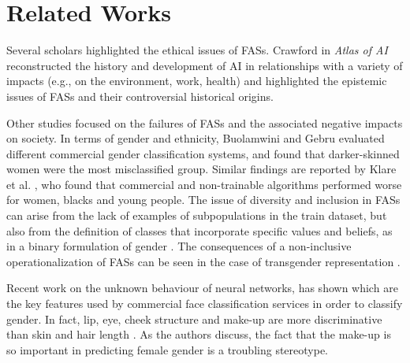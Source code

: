 \section{Related Works}
\label{sec:rel_work}
Several scholars highlighted the ethical issues of FASs.
Crawford in \textit{Atlas of AI} \cite{crawfordAtlasAI2021} reconstructed the history and development of AI in relationships with a variety of impacts (e.g., on the environment, work, health) and highlighted the epistemic issues of FASs and their controversial historical origins.

Other studies focused on the failures of FASs and the associated negative impacts on society. 
In terms of gender and ethnicity, Buolamwini and Gebru \cite{buolamwiniGenderShadesIntersectional2018} evaluated different commercial gender classification systems, and found that darker-skinned women were the most misclassified group.
Similar findings are reported by Klare
et al. \cite{klareFaceRecognitionPerformance2012}, who found that commercial and non-trainable algorithms performed worse for women, blacks and young people.
The issue of diversity and inclusion in FASs can arise from the lack of examples of subpopulations in the train dataset, but also from the definition of classes that incorporate specific values and beliefs, as in a binary formulation of gender \cite{scheuermanHowComputersSee2019}.
The consequences of a non-inclusive operationalization of FASs can be seen in the case of transgender representation \cite{keyesMisgenderingMachinesTrans2018}.

Recent work on the unknown behaviour of neural networks, has shown which are the key features used by commercial face classification services in order to classify gender. 
In fact, lip, eye, cheek structure and make-up are more discriminative than skin and hair length \cite{muthukumarUnderstandingUnequalGender2018}.
As the authors discuss, the fact that the make-up is so important in predicting female gender is a troubling stereotype.


